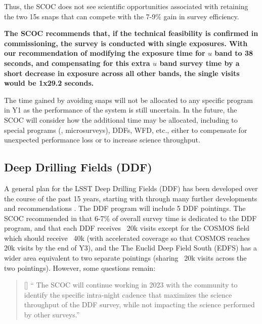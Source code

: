 Thus, the SCOC does not see scientific opportunities associated with retaining the two 15s snaps that can compete with the 7-9\% gain in survey efficiency.

{\bf The SCOC recommends that, if the technical feasibility is confirmed in commissioning, the survey is conducted with single exposures. With our recommendation of modifying the exposure time for $u$ band to 38 seconds, and compensating for this extra $u$ band survey time by a short decrease in exposure across all other bands, the single visits would be 1x29.2 seconds.}

The time gained by avoiding snaps will not be allocated to any specific program in Y1 as the performance of the system is still uncertain. In the future, the SCOC will consider how the additional time may be allocated, including to special programs (\eg, microsurveys), DDFs, WFD, etc., either to compensate for unexpected performance loss or to increase science throughput.

\subsection{Deep Drilling Fields (DDF)}\label{sec:DDF}

A general plan for the LSST Deep Drilling Fields (DDF) has been developed over the course of the past 15 years, starting with \cite{2009arXiv0912.0201L} through many further developments and recommendations \citep[\eg ,][]{Brandt:2018,Scolnic:2018}.
The DDF program will include
5 DDF pointings. The SCOC recommended in  that  
6-7\% of overall survey time is dedicated to the DDF program, and that each DDF receives ~20k visits
except for the COSMOS field which should receive ~40k (with accelerated coverage so that COSMOS reaches 20k visits by the end of Y3), and the 
The Euclid Deep Field South (EDFS) has a wider area equivalent to two separate pointings (sharing ~20k visits across the two pointings). However, some questions remain: 
\begin{quote}
    [] `` The SCOC will continue working in 2023 with the community to identify the specific intra-night cadence that maximizes the science throughput of the DDF survey, while not impacting the science performed by other surveys.''
\end{quote}


